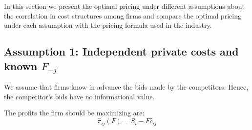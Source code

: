 \documentclass[12pt]{article}
\theoremstyle{plain}
\theoremstyle{plain}
\begin{document}
In this section we present the optimal pricing under different assumptions about the correlation in cost structures among firms and compare the optimal pricing under each assumption with the pricing formula used in the industry. 


\subsection{Assumption 1: Independent private costs and known $F_{-j}$ }\label{sec:independent_private}

We assume that firms know in advance the bids made by the competitors. Hence, the competitor's bids have no informational value. 



The profits the firm should be maximizing are: 
\begin{equation}\label{eq:profit3}
\hat{\pi}_{ij}(F)= S_{i}-F\hat{c}_{ij}
\end{equation}
\end{document}
